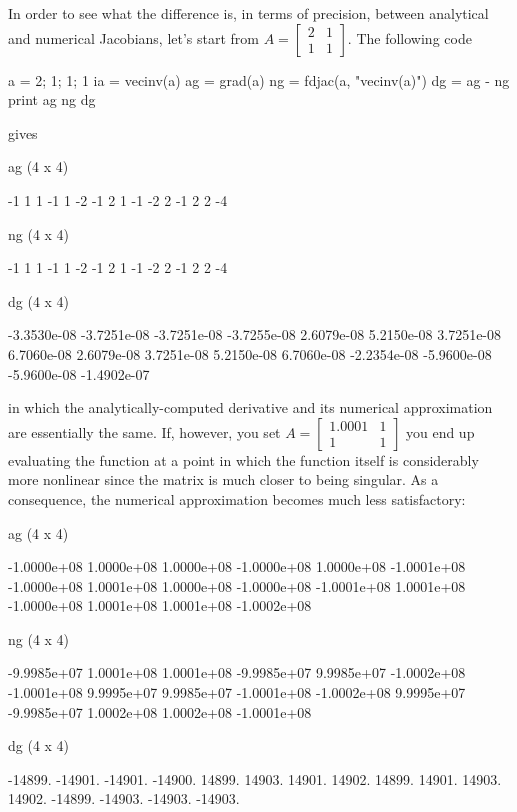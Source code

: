 In order to see what the difference is, in terms of precision, between
analytical and numerical Jacobians, let's start from $A =
\left[\begin{array}{cc} 2 & 1 \\ 1 & 1 \end{array}\right]$. The
following code
\begin{code}
a = {2; 1; 1; 1}
ia = vecinv(a)
ag = grad(a)
ng = fdjac(a, "vecinv(a)")
dg = ag - ng
print ag ng dg  
\end{code}
gives
\begin{code}
ag (4 x 4)

  -1    1    1   -1 
   1   -2   -1    2 
   1   -1   -2    2 
  -1    2    2   -4 

ng (4 x 4)

  -1    1    1   -1 
   1   -2   -1    2 
   1   -1   -2    2 
  -1    2    2   -4 

dg (4 x 4)

 -3.3530e-08  -3.7251e-08  -3.7251e-08  -3.7255e-08 
  2.6079e-08   5.2150e-08   3.7251e-08   6.7060e-08 
  2.6079e-08   3.7251e-08   5.2150e-08   6.7060e-08 
 -2.2354e-08  -5.9600e-08  -5.9600e-08  -1.4902e-07 
\end{code}
in which the analytically-computed derivative and its numerical
approximation are essentially the same. If, however, you set $A =
\left[\begin{array}{cc} 1.0001 & 1 \\ 1 & 1 \end{array}\right]$ you
end up evaluating the function at a point in which the function itself
is considerably more nonlinear since the matrix is much closer to
being singular. As a consequence, the numerical approximation becomes
much less satisfactory:
\begin{code}
ag (4 x 4)

 -1.0000e+08   1.0000e+08   1.0000e+08  -1.0000e+08 
  1.0000e+08  -1.0001e+08  -1.0000e+08   1.0001e+08 
  1.0000e+08  -1.0000e+08  -1.0001e+08   1.0001e+08 
 -1.0000e+08   1.0001e+08   1.0001e+08  -1.0002e+08 

ng (4 x 4)

 -9.9985e+07   1.0001e+08   1.0001e+08  -9.9985e+07 
  9.9985e+07  -1.0002e+08  -1.0001e+08   9.9995e+07 
  9.9985e+07  -1.0001e+08  -1.0002e+08   9.9995e+07 
 -9.9985e+07   1.0002e+08   1.0002e+08  -1.0001e+08 

dg (4 x 4)

     -14899.      -14901.      -14901.      -14900. 
      14899.       14903.       14901.       14902. 
      14899.       14901.       14903.       14902. 
     -14899.      -14903.      -14903.      -14903. 
\end{code}
